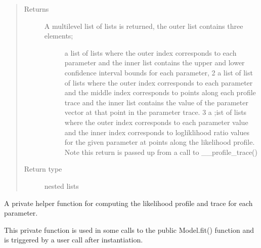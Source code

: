 \documentclass[letterpaper,10pt,english,openany,oneside]{sphinxmanual}
\begin{document}
\begin{fulllineitems}
\begin{fulllineitems}
\begin{quote}
\begin{description}
\item[{Returns}] \leavevmode
\begin{description}
\item[{A multi\sphinxhyphen{}level list of lists is returned, the outer list contains three elements;}]  \sphinxhyphen{} a list of lists where the outer index corresponds to each parameter and the
inner list contains the upper and lower confidence interval bounds for each parameter,
2 \sphinxhyphen{} a list of list of lists where the outer index corresponds to each parameter and
the middle index corresponds to points along each profile trace and the inner list
contains the value of the parameter vector at that point in the parameter trace.
3 \sphinxhyphen{} a ;ist of lists where the outer index corresponds to each parameter value and
the inner index corresponds to logliklihood ratio values for the given parameter
at points along the likelihood profile. Note this return is passed up from a call
to \_\_profile\_trace()

\end{description}


\item[{Return type}] \leavevmode
nested lists

\end{description}\end{quote}

\end{fulllineitems}


\begin{fulllineitems}
\label{\detokenize{nloed:nloed.model.Model.__profile_trace}}
A private helper function for computing the likelihood profile and trace for each
parameter.

This private function is used in some calls to the public Model.fit() function and is
triggered by a user call after instantiation.


\end{fulllineitems}
\end{fulllineitems}
\end{document}

